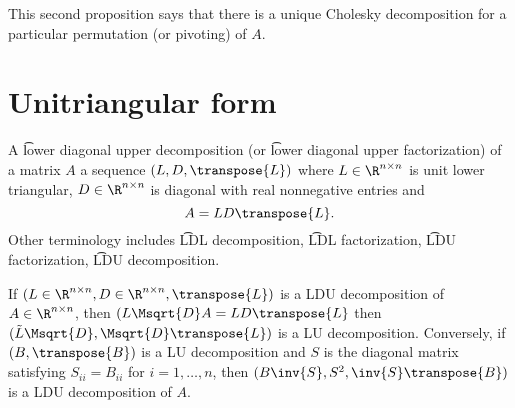 This second proposition says that there is a unique Cholesky decomposition for a particular permutation (or pivoting) of $A$.

\section*{Unitriangular form}

A \t{lower diagonal upper decomposition} (or \t{lower diagonal upper factorization}) of a matrix $A$ a sequence $(L, D, \transpose{L})$ where $L \in \R ^{n \times n}$ is unit lower triangular, $D \in \R ^{n \times n}$ is diagonal with real nonnegative entries and
\[
A = LD\transpose{L}.
\]
Other terminology includes \t{LDL decomposition}, \t{LDL factorization}, \t{LDU factorization}, \t{LDU decomposition}.

If $(L \in \R ^{n \times n}, D \in \R ^{n \times n}, \transpose{L})$ is a LDU decomposition of $A \in \R ^{n \times n}$, then $(L\Msqrt{D}A = LD\transpose{L}$ then $(\tilde{L}\Msqrt{D}, \Msqrt{D}\transpose{L})$ is a LU decomposition.
Conversely, if $(B, \transpose{B})$ is a LU decomposition and $S$ is the diagonal matrix satisfying $S_{ii} = B_{ii}$ for $i = 1, \dots , n$, then $(B\inv{S}, S^2, \inv{S}\transpose{B})$ is a LDU decomposition of $A$.

\blankpage